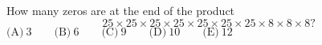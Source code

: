 

How many zeros are at the end of the product \[25\times 25\times 25\times 25\times 25\times 25\times 25\times 8\times 8\times 8?\]
$\text{(A)}\ 3 \qquad \text{(B)}\ 6 \qquad \text{(C)}\ 9 \qquad \text{(D)}\ 10 \qquad \text{(E)}\ 12$
